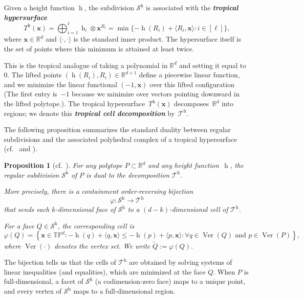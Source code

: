\documentclass[12pt, reqno]{amsart}
\newcommand{\defn}[1]{{\color{blue!50!black}\textbf{\emph{#1}}}}
\newcommand{\h}{\operatorname{h}}
\theoremstyle{plain}
\newtheorem{proposition}[theorem]{Proposition}
\theoremstyle{definition}
\numberwithin{equation}{section}
\begin{document}
Given a height function $\h$, the subdivision $\mathcal{S}^{\h}$ is associated with the \defn{tropical hypersurface}
\[
T^{\h}(\mathbf{x}) = \bigoplus_{i=1}^{\ell} \h_i \otimes 
\mathbf{x}^{R_i} = \min\{-\h(R_i) + \langle R_i,\mathbf{x}\rangle 
: i\in[\ell]\},
\]
where $\mathbf{x}\in\mathbb{R}^d$ and $\langle\cdot,\cdot\rangle$ is the standard inner product. The hypersurface itself is the set of points where this minimum is attained at least twice.

This is the tropical analogue of taking a polynomial in $\mathbb{R}^d$ and setting it equal to~$0$. The lifted points $(\h(R_i), R_i)\in\mathbb{R}^{d+1}$ define a piecewise linear function, and we minimize the linear functional $(-1,\mathbf{x})$ over this lifted configuration (The first entry is~$-1$ because we minimize over vectors pointing downward in the lifted polytope.). The tropical hypersurface~$T^{\h}(\mathbf{x})$ decomposes~$\mathbb{R}^d$ into regions; we denote this \defn{tropical cell decomposition} by~$\mathcal{T}^{\h}$.

The following proposition summarizes the standard duality between regular subdivisions and the associated polyhedral complex of a tropical hypersurface (cf.\ \cite[§1.2, Theorem~1.13]{joswig_essentials_tropical_2021} and \cite[Chapter~3]{maclagan_strumfels_tropicalGeometry}).


\begin{proposition}[{cf.\ \cite{joswig_essentials_tropical_2021,maclagan_strumfels_tropicalGeometry}}]\label{pro: tropical_map}
For any polytope $P\subset\mathbb{R}^d$ and any height function~$\h$, the regular subdivision $\mathcal{S}^{\h}$ of $P$ is dual to the decomposition $\mathcal{T}^{\h}$.

More precisely, there is a containment order-reversing bijection
\[
\varphi:\mathcal{S}^{\h}\longrightarrow\mathcal{T}^{\h}
\]
that sends each $k$-dimensional face of $\mathcal{S}^{\h}$ to a $(d-k)$-dimensional cell of $\mathcal{T}^{\h}$.

For a face $Q\in\mathcal{S}^{\h}$, the corresponding cell is
\[
\varphi(Q)=
\left\{
\mathbf{x}\in\mathbb{TP}^d:
-\h(q)+\langle q,\mathbf{x}\rangle
\le
-\h(p)+\langle p,\mathbf{x}\rangle :
\forall q\in\operatorname{Ver}(Q)
\text{ and } p\in\operatorname{Ver}(P)
\right\},
\]
where $\operatorname{Ver}(\cdot)$ denotes the vertex set. We write $\tilde{Q}:=\varphi(Q)$.
\end{proposition}


The bijection tells us that the cells of $\mathcal{T}^{\h}$ are obtained by solving systems of linear inequalities (and equalities), which are minimized at the face $Q$. When $P$ is full-dimensional, a facet of $\mathcal{S}^{\h}$ (a codimension-zero face) maps to a unique point, and every vertex of $\mathcal{S}^{\h}$ maps to a full-dimensional region.
\end{document}
